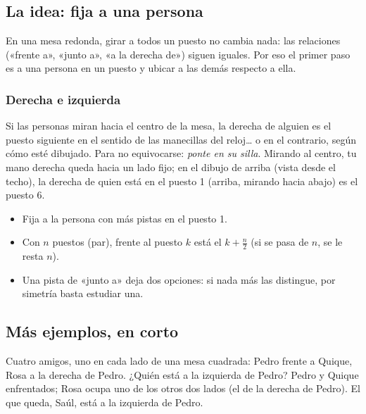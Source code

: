 \bitacora


\subsection{La idea: fija a una persona}
En una mesa redonda, girar a todos un puesto no cambia nada: las relaciones («frente a», «junto a», «a la derecha de»)
siguen iguales. Por eso el primer paso es  a una persona en un puesto y ubicar a las demás respecto a ella.


\subsubsection{Derecha e izquierda}
Si las personas miran hacia el centro de la mesa, la derecha de alguien es el puesto siguiente en el sentido de las
manecillas del reloj… o en el contrario, según cómo esté dibujado. Para no equivocarse: \emph{ponte en su silla}. Mirando
al centro, tu mano derecha queda hacia un lado fijo; en el dibujo de arriba (vista desde el techo), la derecha de quien
está en el puesto 1 (arriba, mirando hacia abajo) es el puesto 6.

\begin{regla}
\begin{itemize}
  \item Fija a la persona con más pistas en el puesto 1.
  \item Con $n$ puestos (par), frente al puesto $k$ está el $k + \tfrac n2$ (si se pasa de $n$, se le resta $n$).
  \item Una pista de «junto a» deja dos opciones: si nada más las distingue, por simetría basta estudiar una.
\end{itemize}
\end{regla}

\subsection{Más ejemplos, en corto}
\begin{ejemplo}
Cuatro amigos, uno en cada lado de una mesa cuadrada: Pedro frente a Quique, Rosa a la derecha de Pedro. ¿Quién está a
la izquierda de Pedro?
\solucion Pedro y Quique enfrentados; Rosa ocupa uno de los otros dos lados (el de la derecha de Pedro). El que queda,
Saúl, está a la izquierda de Pedro.
\end{ejemplo}

